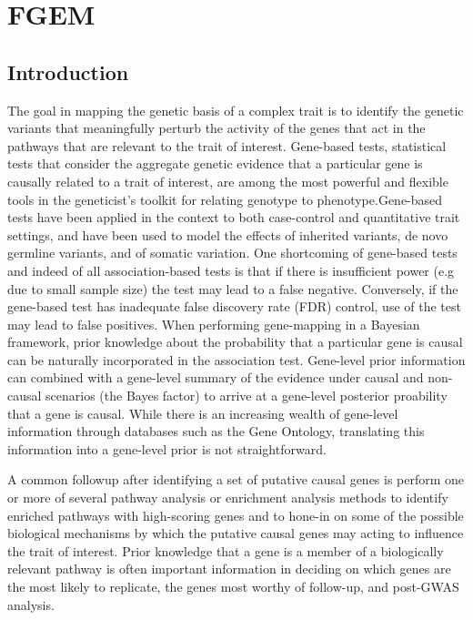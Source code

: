 
\chapter{FGEM}




\section{Introduction}\label{sec:org28fe636}

The goal in mapping the genetic basis of a complex trait is to identify the genetic variants that meaningfully perturb the activity of the genes that act in the pathways that are relevant to the trait of interest.  Gene-based tests,
statistical tests that consider the aggregate genetic evidence that a particular gene is causally related to a trait of interest, are among the most powerful and flexible tools in the geneticist's toolkit for relating genotype to
phenotype.Gene-based tests have been applied in the context to both case-control\cite{skat} and  quantitative trait settings\cite{predixcan}, and have been used to model the effects of inherited variants\cite{skat}, de novo germline variants\cite{TADA}, and of somatic variation\cite{drivermaps}.  One shortcoming of gene-based tests and indeed of all association-based tests is that if there is insufficient power (e.g due to small sample size) the test may lead to a
false negative.  Conversely, if the gene-based test has inadequate false discovery rate (FDR) control, use of the test may lead to false positives. When performing gene-mapping in a Bayesian framework, prior knowledge about the
probability that a particular gene is causal can be naturally incorporated in the association test.  Gene-level prior information can combined with a gene-level summary of the evidence under causal and non-causal scenarios (the Bayes
factor) to arrive at a gene-level posterior proability that a gene is causal.  While there is an increasing wealth of gene-level information through databases such as the Gene Ontology\cite{GO}, translating this information into a
gene-level prior is not straightforward.

A common followup after identifying a set of putative causal genes is perform one or more of several pathway analysis or enrichment analysis methods\cite{rss-e}\cite{Carbonetto_2013}\cite{Lamparter_2016} to identify enriched pathways
with high-scoring genes and to hone-in on some of the possible biological mechanisms by which the putative causal genes may acting to influence the trait of interest. Prior knowledge that a gene is a member of a biologically relevant
pathway is often important information in deciding on which genes are the most likely to replicate, the genes most worthy of follow-up, and post-GWAS analysis\cite{Hou_2013}.

